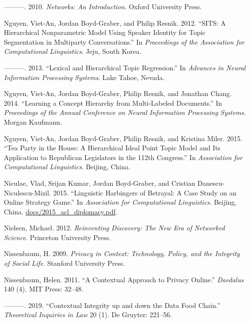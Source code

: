 \documentclass[]{krantz}
\begin{document}
\hypertarget{ref-newman2010networks}{}
---------. 2010. \emph{Networks: An Introduction}. Oxford University
Press.

\hypertarget{ref-nguyen-12}{}
Nguyen, Viet-An, Jordan Boyd-Graber, and Philip Resnik. 2012. ``SITS: A
Hierarchical Nonparametric Model Using Speaker Identity for Topic
Segmentation in Multiparty Conversations.'' In \emph{Proceedings of the
Association for Computational Linguistics}. Jeju, South Korea.

\hypertarget{ref-nguyen-13:shlda}{}
---------. 2013. ``Lexical and Hierarchical Topic Regression.'' In
\emph{Advances in Neural Information Processing Systems}. Lake Tahoe,
Nevada.

\hypertarget{ref-Nguyen:Boyd-Graber:Resnik:Chang-2014}{}
Nguyen, Viet-An, Jordan Boyd-Graber, Philip Resnik, and Jonathan Chang.
2014. ``Learning a Concept Hierarchy from Multi-Labeled Documents.'' In
\emph{Proceedings of the Annual Conference on Neural Information
Processing Systems}. Morgan Kaufmann.

\hypertarget{ref-Nguyen:Boyd-Graber:Resnik:Miler-2015}{}
Nguyen, Viet-An, Jordan Boyd-Graber, Philip Resnik, and Kristina Miler.
2015. ``Tea Party in the House: A Hierarchical Ideal Point Topic Model
and Its Application to Republican Legislators in the 112th Congress.''
In \emph{Association for Computational Linguistics}. Beijing, China.

\hypertarget{ref-niculae-15}{}
Niculae, Vlad, Srijan Kumar, Jordan Boyd-Graber, and Cristian
Danescu-Niculescu-Mizil. 2015. ``Linguistic Harbingers of Betrayal: A
Case Study on an Online Strategy Game.'' In \emph{Association for
Computational Linguistics}. Beijing, China.
\url{docs/2015_acl_diplomacy.pdf}.

\hypertarget{ref-nielsen2012reinventing}{}
Nielsen, Michael. 2012. \emph{Reinventing Discovery: The New Era of
Networked Science}. Princeton University Press.

\hypertarget{ref-nissenbaum2009}{}
Nissenbaum, H. 2009. \emph{Privacy in Context: Technology, Policy, and
the Integrity of Social Life}. Stanford University Press.

\hypertarget{ref-nissenbaum2011contextual}{}
Nissenbaum, Helen. 2011. ``A Contextual Approach to Privacy Online.''
\emph{Daedalus} 140 (4). MIT Press: 32--48.

\hypertarget{ref-nissenbaum2019contextual}{}
---------. 2019. ``Contextual Integrity up and down the Data Food
Chain.'' \emph{Theoretical Inquiries in Law} 20 (1). De Gruyter:
221--56.
\end{document}
